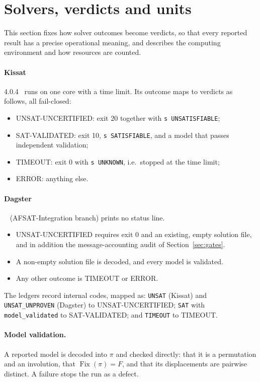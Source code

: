 \documentclass[11pt,a4paper]{article}
\theoremstyle{definition}
\newcommand{\Fix}{\operatorname{Fix}}
\newcommand{\code}[1]{\texttt{#1}}
\newcommand{\st}[1]{\textsf{#1}}
\begin{document}
\section{Solvers, verdicts and units}\label{sec:solvers}
This section fixes how solver outcomes become verdicts, so that every reported result has a precise operational meaning, and describes the computing environment and how resources are counted.


\paragraph{Kissat} 4.0.4~\cite{kissat} runs on one core with a time limit. Its outcome maps
to verdicts as follows, all fail-closed:
\begin{itemize}
\item \st{UNSAT-UNCERTIFIED}: exit 20 together with \code{s UNSATISFIABLE};
\item \st{SAT-VALIDATED}: exit 10, \code{s SATISFIABLE}, and a model that passes independent
validation;
\item \st{TIMEOUT}: exit 0 with \code{s UNKNOWN}, i.e.\ stopped at the time limit;
\item \st{ERROR}: anything else.
\end{itemize}

\paragraph{Dagster}~\cite{dagster} (AFSAT-Integration branch) prints no status line.
\begin{itemize}
\item \st{UNSAT-UNCERTIFIED} requires exit 0 and an existing, empty solution file, and in
addition the message-accounting audit of Section~\ref{sec:gates}.
\item A non-empty solution file is decoded, and every model is validated.
\item Any other outcome is \st{TIMEOUT} or \st{ERROR}.
\end{itemize}
The ledgers record internal codes, mapped as: \code{UNSAT} (Kissat) and \code{UNSAT\_UNPROVEN}
(Dagster) to \st{UNSAT-UNCERTIFIED}; \code{SAT} with \code{model\_validated} to
\st{SAT-VALIDATED}; and \code{TIMEOUT} to \st{TIMEOUT}.

\paragraph{Model validation.} A reported model is decoded into $\pi$ and checked directly:
that it is a permutation and an involution, that $\Fix(\pi)=F$, and that its displacements
are pairwise distinct. A failure stops the run as a defect.
\end{document}
